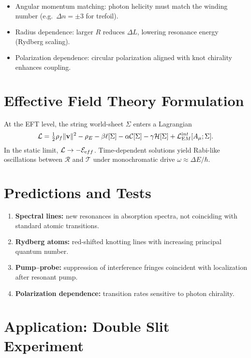 \documentclass[11pt,a4paper]{article}
\begin{document}
        \begin{itemize}
        \item Angular momentum matching: photon helicity must match the winding number (e.g.\ $\Delta n=\pm 3$ for trefoil).
        \item Radius dependence: larger $R$ reduces $\Delta L$, lowering resonance energy (Rydberg scaling).
        \item Polarization dependence: circular polarization aligned with knot chirality enhances coupling.
        \end{itemize}

\section{Effective Field Theory Formulation}

    At the EFT level, the string world-sheet $\Sigma$ enters a Lagrangian
    \begin{equation}
    \mathcal L = \tfrac12 \rho_f \|\mathbf v\|^2 - \rho_E
    - \beta \ell[\Sigma] - \alpha \mathcal C[\Sigma]
    - \gamma \mathcal H[\Sigma] + \mathcal L_{\textrm EM}^{\textrm int}[A_\mu;\Sigma].
    \end{equation}
    In the static limit, $\mathcal L \to -\mathcal E_{\textrm eff}$.
    Time-dependent solutions yield Rabi-like oscillations between $\mathcal R$ and $\mathcal T$
    under monochromatic drive $\omega\approx \Delta E/\hbar$.

\section{Predictions and Tests}

    \begin{enumerate}
    \item \textbf{Spectral lines:} new resonances in absorption spectra, not coinciding with standard atomic transitions.
    \item \textbf{Rydberg atoms:} red-shifted knotting lines with increasing principal quantum number.
    \item \textbf{Pump--probe:} suppression of interference fringes coincident with localization after resonant pump.
    \item \textbf{Polarization dependence:} transition rates sensitive to photon chirality.
    \end{enumerate}

\section{Application: Double Slit Experiment}
\end{document}
